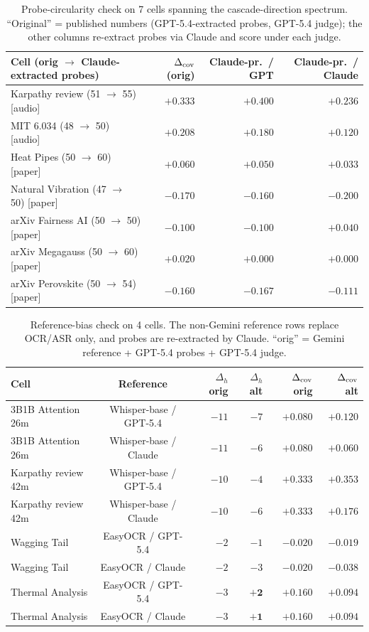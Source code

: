 \documentclass[11pt]{article}
\begin{document}
\begin{table}[h]
\centering
\small
\caption{Probe-circularity check on 7 cells spanning the cascade-direction spectrum. ``Original'' = published numbers (GPT-5.4-extracted probes, GPT-5.4 judge); the other columns re-extract probes via Claude and score under each judge.}
\label{tab:probe_circularity_appdx}
\begin{tabular}{lrrr}
\toprule
Cell (orig $\to$ Claude-extracted probes) & $\Delta_{\rm cov}$ (orig) & Claude-pr.\ / GPT & Claude-pr.\ / Claude \\
\midrule
Karpathy review (51 $\to$ 55) [audio]     & $+0.333$ & $+0.400$ & $+0.236$ \\
MIT 6.034 (48 $\to$ 50) [audio]            & $+0.208$ & $+0.180$ & $+0.120$ \\
Heat Pipes (50 $\to$ 60) [paper]     & $+0.060$ & $+0.050$ & $+0.033$ \\
Natural Vibration (47 $\to$ 50) [paper] & $-0.170$ & $-0.160$ & $-0.200$ \\
arXiv Fairness AI (50 $\to$ 50) [paper] & $-0.100$ & $-0.100$ & $+0.040$ \\
arXiv Megagauss (50 $\to$ 60) [paper]   & $+0.020$ & $+0.000$ & $+0.000$ \\
arXiv Perovskite (50 $\to$ 54) [paper]  & $-0.160$ & $-0.167$ & $-0.111$ \\
\bottomrule
\end{tabular}
\end{table}

\begin{table}[h]
\centering
\small
\caption{Reference-bias check on 4 cells. The non-Gemini reference rows replace OCR/ASR only, and probes are re-extracted by Claude. ``orig'' = Gemini reference + GPT-5.4 probes + GPT-5.4 judge.}
\label{tab:ref_bias_appdx}
\begin{tabular}{lcrrrr}
\toprule
Cell & Reference & $\Delta_h$ orig & $\Delta_h$ alt & $\Delta_{\rm cov}$ orig & $\Delta_{\rm cov}$ alt \\
\midrule
3B1B Attention 26m   & Whisper-base / GPT-5.4 & $-11$ & $-7$ & $+0.080$ & $+0.120$ \\
3B1B Attention 26m   & Whisper-base / Claude  & $-11$ & $-6$ & $+0.080$ & $+0.060$ \\
Karpathy review 42m  & Whisper-base / GPT-5.4 & $-10$ & $-4$ & $+0.333$ & $+0.353$ \\
Karpathy review 42m  & Whisper-base / Claude  & $-10$ & $-6$ & $+0.333$ & $+0.176$ \\
Wagging Tail      & EasyOCR / GPT-5.4      & $-2$  & $-1$ & $-0.020$ & $-0.019$ \\
Wagging Tail      & EasyOCR / Claude       & $-2$  & $-3$ & $-0.020$ & $-0.038$ \\
Thermal Analysis & EasyOCR / GPT-5.4      & $-3$  & $\mathbf{+2}$ & $+0.160$ & $+0.094$ \\
Thermal Analysis & EasyOCR / Claude       & $-3$  & $\mathbf{+1}$ & $+0.160$ & $+0.094$ \\
\bottomrule
\end{tabular}
\end{table}
\end{document}
